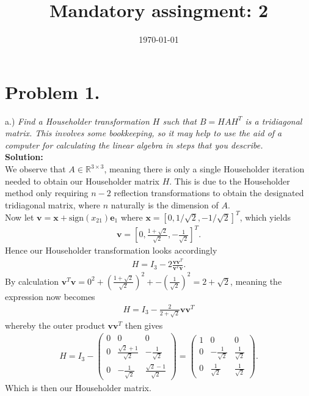\documentclass[12pt,
               a4paper,
               article,
               oneside,
               english,oldfontcommands]{memoir}
\date{\today}
\title{Mandatory assingment: 2}
\newcommand{\R}{\mathbb{R}}
\newcommand{\spaze}{\vspace{4mm}\\}
\begin{document}
\header{}
\section*{\centering Problem 1.}
a.) \emph{Find a Householder transformation $H$ such that $B = HAH^T$ is a tridiagonal matrix. This involves some bookkeeping, so it may help to use the aid of a computer for calculating the linear algebra in steps that you describe.} \spaze
\textbf{Solution:} \spaze 
We observe that $A \in \R^{3 \times 3}$, meaning there is only a single Householder iteration needed to obtain our Householder matrix $H$. This is due to the Householder method only requiring $n-2$ reflection transformations to obtain the designated tridiagonal matrix, where $n$ naturally is the dimension of $A$. \vspace{2mm}\\ 
Now let $\bm{v} = \bm{x} + \text{sign}({x_{21}} )\bm{e}_1$ where $\bm{x} = [0, 1 / \sqrt{2},-1 / \sqrt{2}]^T$, which yields 
\begin{align*}
\bm{v} = \left[0, \frac{1 + \sqrt{2}}{\sqrt{2}},  -\frac{1}{\sqrt{2}} \right]^T.
\end{align*}
Hence our Householder transformation looks accordingly 
\begin{align*}
H = I_{3} - 2 \frac{\bm{v} \bm{v}^T}{\bm{v}^T \bm{v}}.
\end{align*}
By calculation $\bm{v}^T \bm{v} = 0^2 + (\frac{1 + \sqrt{2}}{\sqrt{2}})^2 + -(\frac{1}{\sqrt{2}})^2 = 2 + \sqrt{2}$, meaning the expression now becomes 
\begin{align*}
H = I_{3} - \frac{2}{2 + \sqrt{2}} \bm{v} \bm{v}^T 
\end{align*}
whereby the outer product $\bm{v} \bm{v}^T$ then gives 
\begin{align*}
H =  I_{3} - \begin{pmatrix}
0 &0 & 0 \\[5pt]
0 & \frac{\sqrt{2} + 1}{\sqrt{2}} & -\frac{1}{\sqrt{2}} \\[5pt]
0 & -\frac{1}{\sqrt{2}} & \frac{\sqrt{2} -1}{\sqrt{2}} 
\end{pmatrix} = 
\begin{pmatrix}
1 & 0 & 0 \\[5pt]
0 & -\frac{1}{\sqrt{2}} & \frac{1}{\sqrt{2}} \\[5pt]
0 & \frac{1}{\sqrt{2}} & \frac{1}{\sqrt{2}}
\end{pmatrix}.
\end{align*}
Which is then our Householder matrix. \vspace{2mm}\\
\end{document}
